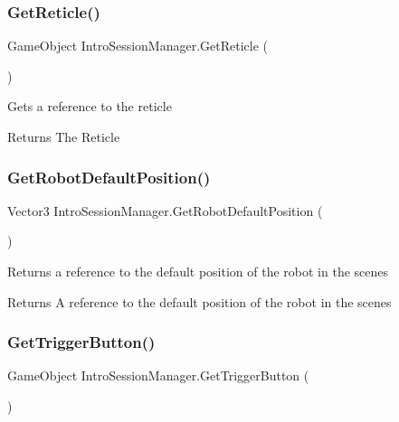 \subsubsection{\texorpdfstring{Get\+Reticle()}{GetReticle()}}
{\footnotesize\ttfamily Game\+Object Intro\+Session\+Manager.\+Get\+Reticle (\begin{DoxyParamCaption}{ }\end{DoxyParamCaption})}



Gets a reference to the reticle 

\begin{DoxyReturn}{Returns}
The Reticle
\end{DoxyReturn}
\mbox{\label{class_intro_session_manager_ab271ab8ae6b7e13929f05fd55670dc3f}} 
\subsubsection{\texorpdfstring{Get\+Robot\+Default\+Position()}{GetRobotDefaultPosition()}}
{\footnotesize\ttfamily Vector3 Intro\+Session\+Manager.\+Get\+Robot\+Default\+Position (\begin{DoxyParamCaption}{ }\end{DoxyParamCaption})}



Returns a reference to the default position of the robot in the scenes 

\begin{DoxyReturn}{Returns}
A reference to the default position of the robot in the scenes
\end{DoxyReturn}
\mbox{\label{class_intro_session_manager_a78cade3f987f624f20d216b53a1c8f90}} 
\subsubsection{\texorpdfstring{Get\+Trigger\+Button()}{GetTriggerButton()}}
{\footnotesize\ttfamily Game\+Object Intro\+Session\+Manager.\+Get\+Trigger\+Button (\begin{DoxyParamCaption}{ }\end{DoxyParamCaption})}



